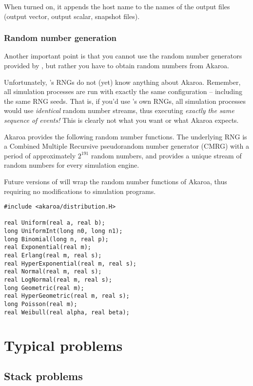 When turned on, it appends the host name to the names of the output
files (output vector, output scalar, snapshot files).


\subsubsection{Random number generation}

Another important point is that you cannot use the random number
generators provided by {\opp}, but rather you have to obtain
random numbers from Akaroa.

Unfortunately, {\opp}'s RNGs do not (yet) know anything about Akaroa.
Remember, all simulation processes are run with exactly the same
configuration -- including the same RNG seeds.
That is, if you'd use {\opp}'s own RNGs,
all simulation processes would use \textit{identical} random number streams,
thus executing \textit{exactly the same sequence of events!}
This is clearly not what you want or what Akaroa expects.

Akaroa provides the following random number functions. The underlying
RNG is a Combined Multiple Recursive pseudorandom
number generator (CMRG) with a period of approximately $2^{191}$
random numbers, and provides a unique stream of random numbers
for every simulation engine.

Future versions of {\opp} will wrap the random number functions
of Akaroa, thus requiring no modifications to simulation programs.


\begin{verbatim}
#include <akaroa/distribution.H>

real Uniform(real a, real b);
long UniformInt(long n0, long n1);
long Binomial(long n, real p);
real Exponential(real m);
real Erlang(real m, real s);
real HyperExponential(real m, real s);
real Normal(real m, real s);
real LogNormal(real m, real s);
long Geometric(real m);
real HyperGeometric(real m, real s);
long Poisson(real m);
real Weibull(real alpha, real beta);
\end{verbatim}





\section{Typical problems}

\subsection{Stack problems}

